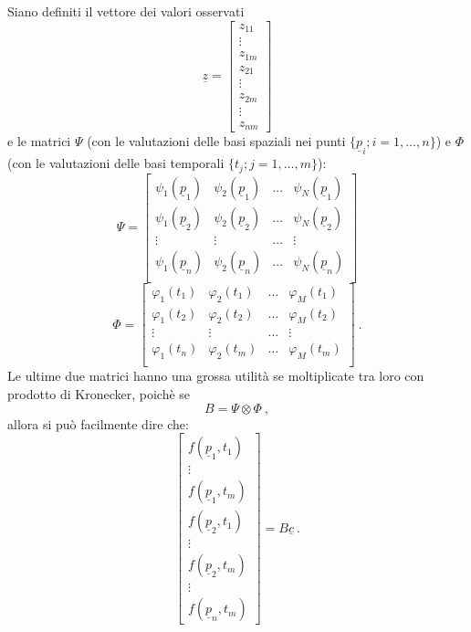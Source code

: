 \documentclass[a4paper,11pt,twoside,openright]{book}							%
\begin{document}
Siano definiti il vettore dei valori osservati
\begin{equation}
\underline z =
\begin{bmatrix}
z_{11}  \\
\vdots\\
z_{1m}  \\
z_{21}  \\
\vdots\\
z_{2m}  \\
\vdots\\
z_{nm}
\end{bmatrix}
\end{equation}
e le matrici $\Psi$ (con le valutazioni delle basi spaziali nei punti $\{\underline p_i; i = 1,\ldots,n\}$) e $\Phi$ (con le valutazioni delle basi temporali $\{t_j; j = 1,\ldots,m\}$):
$$
\Psi =
\begin{bmatrix}
\psi_{1}(\underline p_1) & \psi_{2}(\underline p_1) & \hdots & \psi_{N}(\underline p_1)  \\
\psi_{1}(\underline p_2) & \psi_{2}(\underline p_2) & \hdots & \psi_{N}(\underline p_2)  \\
\vdots & \vdots & \hdots & \vdots \\
\psi_{1}(\underline p_n) & \psi_{2}(\underline p_n) & \hdots & \psi_{N}(\underline p_n)  \\
\end{bmatrix}
$$
$$
\Phi = 
\begin{bmatrix}
\varphi_{1}( t_1) & \varphi_{2}( t_1) & \hdots & \varphi_{M}( t_1)  \\
\varphi_{1}( t_2) & \varphi_{2}( t_2) & \hdots & \varphi_{M}( t_2)  \\
\vdots & \vdots & \hdots & \vdots \\
\varphi_{1}( t_n) & \varphi_{2}( t_m) & \hdots & \varphi_{M}( t_m)  \\
\end{bmatrix} \ .
$$
Le ultime due matrici hanno una grossa utilità se moltiplicate tra loro con prodotto di Kronecker, poichè se
$$ B = \Psi \otimes \Phi \ ,$$
allora si può facilmente dire che:
$$
\begin{bmatrix}
f(\underline p_1,t_1)  \\
\vdots\\
f(\underline p_1,t_m)  \\
f(\underline p_2,t_1)  \\
\vdots\\
f(\underline p_2,t_m)  \\
\vdots\\
f(\underline p_n,t_m)
\end{bmatrix}= B \underline c \ .
$$
\end{document}
